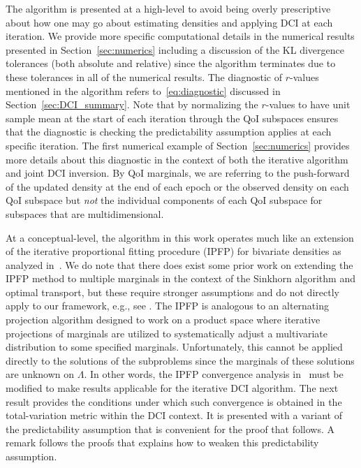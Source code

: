 \documentclass{article}
\newcounter{example}[section]
\newcommand{\pspace}{\Lambda}
\begin{document}
The algorithm is presented at a high-level to avoid being overly prescriptive about how one may go about estimating densities and applying DCI at each iteration. 
We provide more specific computational details in the numerical results presented in Section~\ref{sec:numerics} including a discussion of the KL divergence tolerances (both absolute and relative) since the algorithm terminates due to these tolerances in all of the numerical results.
The diagnostic of $r$-values mentioned in the algorithm refers to~\eqref{eq:diagnostic} discussed in Section~\ref{sec:DCI_summary}.
Note that by normalizing the $r$-values to have unit sample mean at the start of each iteration through the QoI subspaces ensures that the diagnostic is checking the predictability assumption applies at each specific iteration.
The first numerical example of Section~\ref{sec:numerics} provides more details about this diagnostic in the context of both the iterative algorithm and joint DCI inversion. 
By QoI marginals, we are referring to the push-forward of the updated density at the end of each epoch or the observed density on each QoI subspace but {\em not} the individual components of each QoI subspace for subspaces that are multidimensional. 


At a conceptual-level, the algorithm in this work operates much like an extension of the iterative proportional fitting procedure (IPFP) for bivariate densities as analyzed in~\cite{Ruschendorf1995}. 
We do note that there does exist some prior work on extending the IPFP method to multiple marginals in the context of the Sinkhorn algorithm and optimal transport, but these require stronger assumptions and do not directly apply to our framework, e.g., see \cite{Marino2020}.
The IPFP is analogous to an alternating projection algorithm designed to work on a product space where iterative projections of marginals are utilized to systematically adjust a multivariate distribution to some specified marginals. 
Unfortunately, this cannot be applied directly to the solutions of the subproblems since the marginals of these solutions are unknown on $\pspace$.
In other words, the IPFP convergence analysis in~\cite{Ruschendorf1995} must be modified to make results applicable for the iterative DCI algorithm.
The next result provides the conditions under which such convergence is obtained in the total-variation metric within the DCI context.  
It is presented with a variant of the predictability assumption that is convenient for the proof that follows. 
A remark follows the proofs that explains how to weaken this predictability assumption. 
\end{document}
